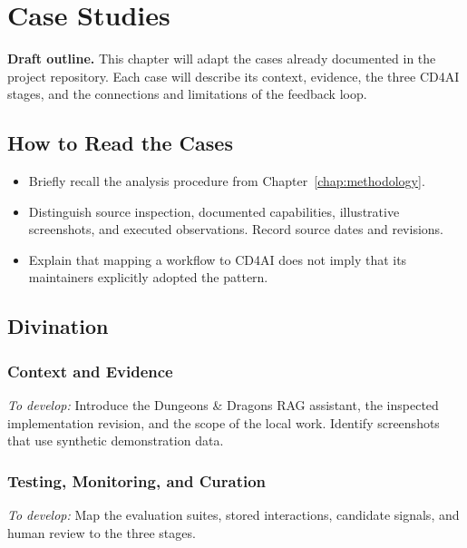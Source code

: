 \chapter{Case Studies}
\label{chap:case-studies}

\textbf{Draft outline.} This chapter will adapt the cases already documented
in the project repository. Each case will describe its context, evidence, the
three CD4AI stages, and the connections and limitations of the feedback loop.


\section{How to Read the Cases}
\label{sec:cases-overview}

\begin{itemize}
  \item Briefly recall the analysis procedure from Chapter~\ref{chap:methodology}.
  \item Distinguish source inspection, documented capabilities, illustrative
    screenshots, and executed observations. Record source dates and revisions.
  \item Explain that mapping a workflow to CD4AI does not imply that its
    maintainers explicitly adopted the pattern.
\end{itemize}

\section{Divination}
\label{sec:case-divination}

\subsection{Context and Evidence}
\noindent\emph{To develop:} Introduce the Dungeons \& Dragons RAG assistant,
the inspected implementation revision, and the scope of the local work.
Identify screenshots that use synthetic demonstration data.

\subsection{Testing, Monitoring, and Curation}
\noindent\emph{To develop:} Map the evaluation suites, stored interactions,
candidate signals, and human review to the three stages.

